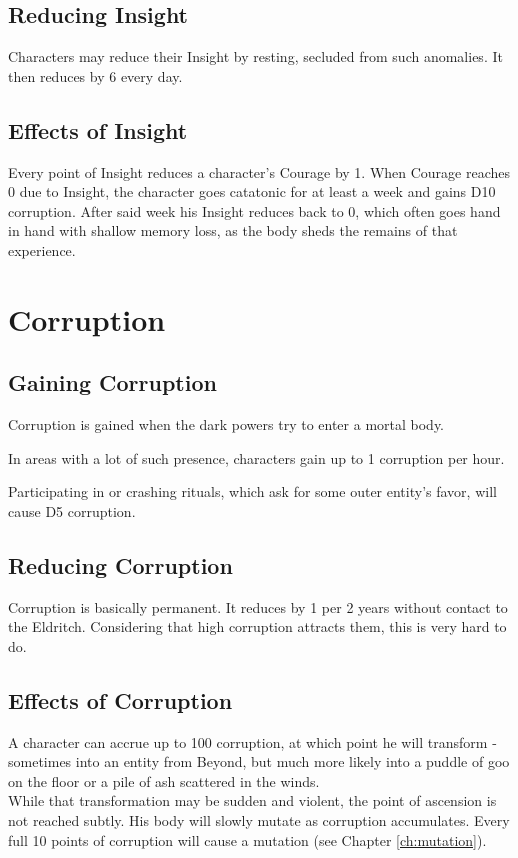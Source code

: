 \documentclass[12pt,a4paper,openany]{book}
\begin{document}
	\subsection{Reducing Insight}
	Characters may reduce their Insight by resting,
		secluded from such anomalies.
	It then reduces by 6 every day.
	\subsection{Effects of Insight}
	Every point of Insight reduces a character's Courage by 1.
	When Courage reaches 0 due to Insight,
		the character goes catatonic for at least a week and gains D10 corruption.
	After said week his Insight reduces back to 0,
		which often goes hand in hand with shallow memory loss,
		as the body sheds the remains of that experience.
	
	\section{Corruption}
	\subsection{Gaining Corruption}
	Corruption is gained when the dark powers try to enter a mortal body.
	\begin{sitemize}[8]
		\item In areas with a lot of such presence, characters gain up to 1 corruption per hour.
		\item Participating in or crashing rituals, which ask for some outer entity's favor, will cause D5 corruption.
	\end{sitemize}
	\subsection{Reducing Corruption}
	Corruption is basically permanent.
	It reduces by 1 per 2 years without contact to the Eldritch.
	Considering that high corruption attracts them, this is very hard to do.
	\subsection{Effects of Corruption}
	A character can accrue up to 100 corruption, at which point he will transform
		- sometimes into an entity from Beyond,
		but much more likely into
		a puddle of goo on the floor
		or a pile of ash scattered in the winds.
		\\%
	While that transformation may be sudden and violent,
		the point of ascension is not reached subtly.
	His body will slowly mutate as corruption accumulates.
	Every full 10 points of corruption will cause a mutation (see Chapter \ref{ch:mutation}).
	
\end{document}
